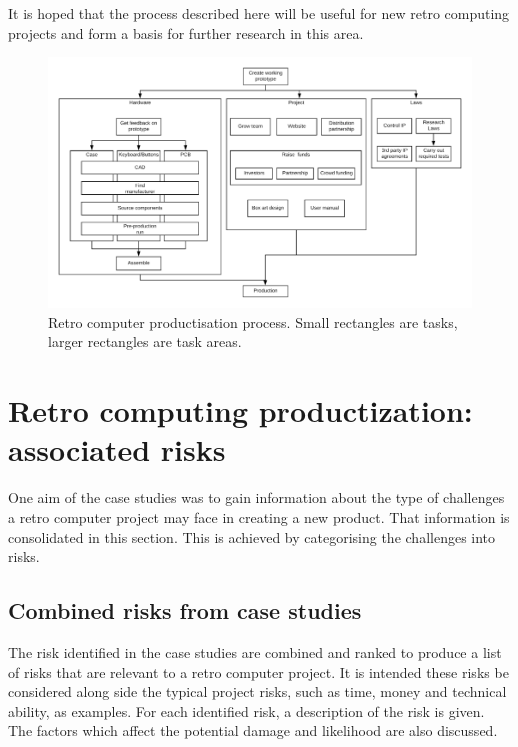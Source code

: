 It is hoped that the process described here will be useful for new retro computing projects and form a basis for further research in this area. \\

\begin{figure} \begin{center}
\includegraphics[width= 1\linewidth]{pics/case_study_process} 
\end{center} 
\caption{Retro computer productisation process. Small rectangles are tasks, larger rectangles are task areas.}
\label{case_study_process}
\end{figure} 

\section{Retro computing productization: associated risks}
One aim of the case studies was to gain information about the type of challenges a retro computer project may face in creating a new product. That information is consolidated in this section. This is achieved by categorising the challenges into risks.


\subsection{Combined risks from case studies}
The risk identified in the case studies are combined and ranked to produce a list of risks that are relevant to a retro computer project. It is intended these risks be considered along side the typical project risks, such as time, money and technical ability, as examples. For each identified risk, a description of the risk is given. The factors which affect the potential damage and likelihood are also discussed. \\

